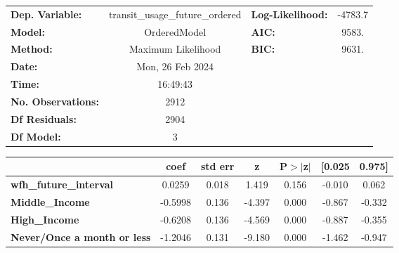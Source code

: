 \documentclass{report}
\begin{document}
\begin{center}
\begin{tabular}{lclc}
\toprule
\textbf{Dep. Variable:}                           & transit\_usage\_future\_ordered & \textbf{  Log-Likelihood:    } &   -4783.7   \\
\textbf{Model:}                                   &           OrderedModel          & \textbf{  AIC:               } &     9583.   \\
\textbf{Method:}                                  &        Maximum Likelihood       & \textbf{  BIC:               } &     9631.   \\
\textbf{Date:}                                    &         Mon, 26 Feb 2024        & \textbf{                     } &             \\
\textbf{Time:}                                    &             16:49:43            & \textbf{                     } &             \\
\textbf{No. Observations:}                        &                2912             & \textbf{                     } &             \\
\textbf{Df Residuals:}                            &                2904             & \textbf{                     } &             \\
\textbf{Df Model:}                                &                   3             & \textbf{                     } &             \\
\bottomrule
\end{tabular}
\begin{tabular}{lcccccc}
                                                  & \textbf{coef} & \textbf{std err} & \textbf{z} & \textbf{P$> |$z$|$} & \textbf{[0.025} & \textbf{0.975]}  \\
\midrule
\textbf{wfh\_future\_interval}                    &       0.0259  &        0.018     &     1.419  &         0.156        &       -0.010    &        0.062     \\
\textbf{Middle\_Income}                           &      -0.5998  &        0.136     &    -4.397  &         0.000        &       -0.867    &       -0.332     \\
\textbf{High\_Income}                             &      -0.6208  &        0.136     &    -4.569  &         0.000        &       -0.887    &       -0.355     \\
\textbf{Never/Once a month or less}               &      -1.2046  &        0.131     &    -9.180  &         0.000        &       -1.462    &       -0.947     \\

\end{tabular}
\end{center}
\end{document}
